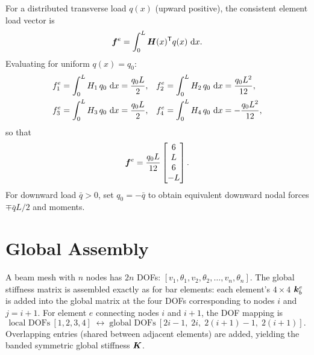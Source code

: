 For a distributed transverse load $q(x)$ (upward positive), the consistent
element load vector is
\begin{equation}
    \bm{f}^e = \int_0^L \bm{H}(x)^{\mathsf{T}} q(x)\,\,\mathrm{d} x .
    \label{eq:beam_load_integral}
\end{equation}
Evaluating for uniform $q(x) = q_0$:
\begin{align}
    f^e_1 &= \int_0^L H_1\,q_0\,\,\mathrm{d} x = \frac{q_0 L}{2} , &
    f^e_2 &= \int_0^L H_2\,q_0\,\,\mathrm{d} x = \frac{q_0 L^2}{12} , \notag \\
    f^e_3 &= \int_0^L H_3\,q_0\,\,\mathrm{d} x = \frac{q_0 L}{2} , &
    f^e_4 &= \int_0^L H_4\,q_0\,\,\mathrm{d} x = -\frac{q_0 L^2}{12} ,
\end{align}
so that
\begin{equation}
    \bm{f}^e = \frac{q_0 L}{12}
    \begin{bmatrix} 6 \\ L \\ 6 \\ -L \end{bmatrix} .
    \label{eq:beam_load}
\end{equation}
For downward load $\bar{q} > 0$, set $q_0 = -\bar{q}$ to obtain equivalent
downward nodal forces $\mp\bar{q}L/2$ and moments.

\section{Global Assembly}
\label{sec:beam_assembly}

A beam mesh with $n$ nodes has $2n$ DOFs: $[v_1, \theta_1, v_2, \theta_2,
\ldots, v_n, \theta_n]$. The global stiffness matrix is assembled exactly as
for bar elements: each element's $4\times4$ $\bm{k}^e_b$ is added into the
global matrix at the four DOFs corresponding to nodes $i$ and $j = i+1$.
For element $e$ connecting nodes $i$ and $i+1$, the DOF mapping is
\begin{equation}
    \text{local DOFs}\ [1,2,3,4]
    \;\longleftrightarrow\;
    \text{global DOFs}\ [2i-1,\;2i,\;2(i+1)-1,\;2(i+1)] .
    \label{eq:beam_assembly}
\end{equation}
Overlapping entries (shared between adjacent elements) are added, yielding
the banded symmetric global stiffness $\bm{K}$.

